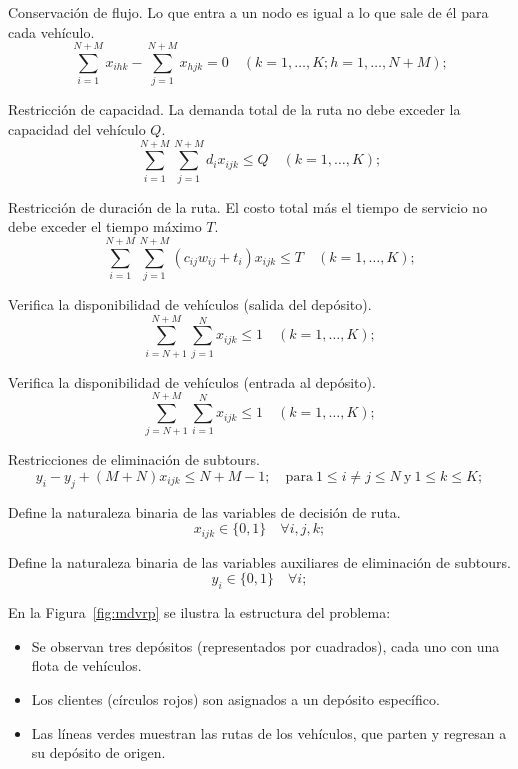 Conservación de flujo. Lo que entra a un nodo es igual a lo que sale de él para cada vehículo.
\begin{equation}
\sum_{i = 1}^{N + M}x_{ihk} - \sum_{j = 1}^{N + M}x_{hjk} = 0 \quad (k = 1,\dots ,K;h = 1,\dots ,N + M);
\end{equation}

Restricción de capacidad. La demanda total de la ruta no debe exceder la capacidad del vehículo \(Q\).
\begin{equation}
\sum_{i = 1}^{N + M}\sum_{j = 1}^{N + M}d_{i}x_{ijk}\leq Q \quad (k = 1,\dots ,K);
\end{equation}

Restricción de duración de la ruta. El costo total más el tiempo de servicio no debe exceder el tiempo máximo \(T\).
\begin{equation}
\sum_{i = 1}^{N + M}\sum_{j = 1}^{N + M}(c_{ij}w_{ij} + t_i)x_{ijk}\leq T \quad (k = 1,\dots,K);
\end{equation}

Verifica la disponibilidad de vehículos (salida del depósito).
\begin{equation}
\sum_{i = N + 1}^{N + M}\sum_{j = 1}^{N}x_{ijk}\leq 1 \quad (k = 1,\dots,K);
\end{equation}

Verifica la disponibilidad de vehículos (entrada al depósito).
\begin{equation}
\sum_{j = N + 1}^{N + M}\sum_{i = 1}^{N}x_{ijk}\leq 1 \quad (k = 1,\dots,K);
\end{equation}

Restricciones de eliminación de subtours.
\begin{equation}
y_{i} - y_{j} + (M + N)x_{ijk}\leq N + M - 1; \quad \mathrm{para} \ 1\leq i\neq j\leq N \ \mathrm{y} \ 1\leq k\leq K;
\end{equation}

Define la naturaleza binaria de las variables de decisión de ruta.
\begin{equation}
x_{ijk}\in \{0,1\} \quad \forall i,j,k;
\end{equation}

Define la naturaleza binaria de las variables auxiliares de eliminación de subtours.
\begin{equation}
y_{i}\in \{0,1\} \quad \forall i;
\end{equation}

En la Figura~\ref{fig:mdvrp} se ilustra la estructura del problema:

\begin{itemize}
  \item Se observan tres depósitos (representados por cuadrados), cada uno con una flota de vehículos.
  \item Los clientes (círculos rojos) son asignados a un depósito específico.
  \item Las líneas verdes muestran las rutas de los vehículos, que parten y regresan a su depósito de origen.
\end{itemize}

